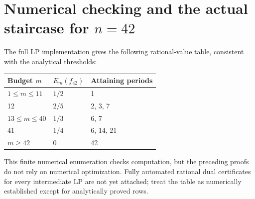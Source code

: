 \documentclass[11pt,a4paper,oneside]{book}
\begin{document}
\section{Numerical checking and the actual staircase for $n=42$}
The full LP implementation gives the following rational-value table, consistent with the analytical thresholds:
\begin{center}\begin{tabular}{lll}\toprule Budget $m$&$E_m(f_{42})$&Attaining periods\\\midrule
$1\le m\le11$&$1/2$&1\\12&$2/5$&2, 3, 7\\$13\le m\le40$&$1/3$&6, 7\\41&$1/4$&6, 14, 21\\$m\ge42$&0&42\\\bottomrule\end{tabular}\end{center}
This finite numerical enumeration checks computation, but the preceding proofs do not rely on numerical optimization. Fully automated rational dual certificates for every intermediate LP are not yet attached; treat the table as numerically established except for analytically proved rows.
\end{document}
